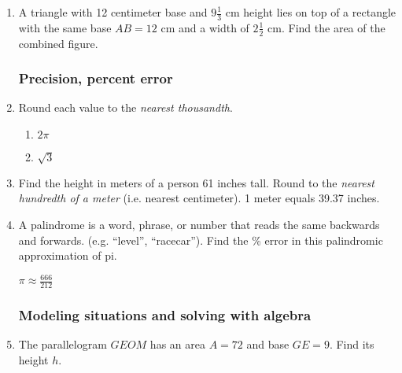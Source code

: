 \begin{enumerate}
\newpage
\item A triangle with 12 centimeter base and $9 \frac{1}{3}$ cm height lies on top of a rectangle with the same base $AB=12$ cm and a width of $2 \frac{1}{2}$ cm. Find the area of the combined figure. \par \medskip
   \vspace{1.0cm}

\subsubsection*{Precision, percent error}
\item Round each value to the \emph{nearest thousandth}.
  \begin{multicols}{2}
    \begin{enumerate}
      \item $2 \pi$
      \item $\sqrt{3}$
    \end{enumerate}
  \end{multicols} \bigskip 

\item Find the height in meters of a person 61 inches tall. Round to the \emph{nearest hundredth of a meter} (i.e. nearest centimeter). 1 meter equals 39.37 inches.
\vspace{3cm}

\item A palindrome is a word, phrase, or number that reads the same backwards and forwards. (e.g. ``level'', ``racecar''). Find the \% error in this palindromic approximation of pi. \par \bigskip
  $\displaystyle \pi \approx \frac{666}{212}$ \vspace{1.5cm}
  
\newpage
\subsubsection*{Modeling situations and solving with algebra}
\item The parallelogram $GEOM$ has an area $A=72$ and base $GE=9$. Find its height $h$. \par


\end{enumerate}
